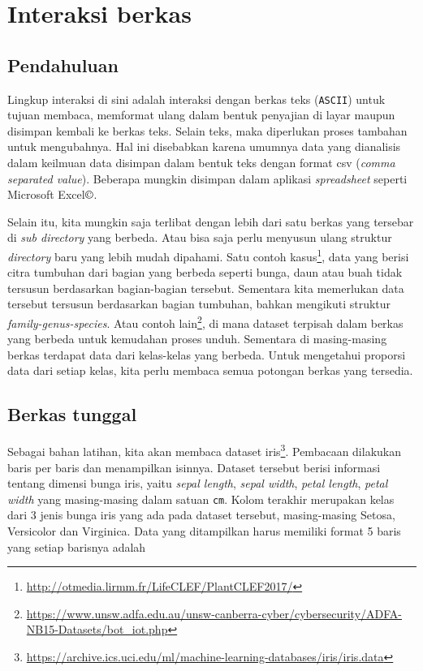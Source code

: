 \chapter{Interaksi berkas}
\section{Pendahuluan}
Lingkup interaksi di sini adalah interaksi dengan berkas teks (\texttt{ASCII}) untuk tujuan membaca, memformat ulang dalam bentuk penyajian di layar maupun disimpan kembali ke berkas teks. Selain teks, maka diperlukan proses tambahan untuk mengubahnya. Hal ini disebabkan karena umumnya data yang dianalisis dalam keilmuan data disimpan dalam bentuk teks dengan format csv (\textit{comma separated value}). Beberapa mungkin disimpan dalam aplikasi \textit{spreadsheet} seperti Microsoft Excel$\copyright$. 

Selain itu, kita mungkin saja terlibat dengan lebih dari satu berkas yang tersebar di \textit{sub directory}  yang berbeda. Atau bisa saja perlu menyusun ulang struktur \textit{directory} baru yang lebih mudah dipahami. Satu contoh kasus\footnote{\url{http://otmedia.lirmm.fr/LifeCLEF/PlantCLEF2017/}}, data yang berisi citra tumbuhan dari bagian yang berbeda seperti bunga, daun atau buah tidak tersusun berdasarkan bagian-bagian tersebut. Sementara kita memerlukan data tersebut tersusun berdasarkan bagian tumbuhan, bahkan mengikuti struktur \textit{family-genus-species}. Atau contoh lain\footnote{\url{https://www.unsw.adfa.edu.au/unsw-canberra-cyber/cybersecurity/ADFA-NB15-Datasets/bot\_iot.php}}, di mana dataset terpisah dalam berkas yang berbeda untuk kemudahan proses unduh. Sementara di masing-masing berkas terdapat data dari kelas-kelas yang berbeda. Untuk mengetahui proporsi data dari setiap kelas, kita perlu membaca semua potongan berkas yang tersedia.

\section{Berkas tunggal}
Sebagai bahan latihan, kita akan membaca dataset iris\footnote{\url{https://archive.ics.uci.edu/ml/machine-learning-databases/iris/iris.data}}. Pembacaan dilakukan baris per baris dan menampilkan isinnya. Dataset tersebut berisi informasi tentang dimensi bunga iris, yaitu \textit{sepal length}, \textit{sepal width}, \textit{petal length}, \textit{petal width} yang masing-masing dalam satuan \texttt{cm}. Kolom terakhir merupakan kelas dari 3 jenis bunga iris yang ada pada dataset tersebut, masing-masing Setosa, Versicolor dan Virginica. Data yang ditampilkan harus memiliki format 5 baris yang setiap barisnya adalah


